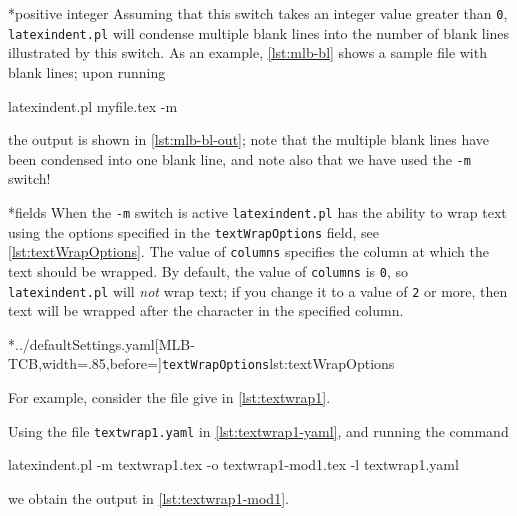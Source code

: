 *{positive integer}
	Assuming that this switch takes an integer value greater than \texttt{0}, \texttt{latexindent.pl} will condense multiple blank lines into the number of blank lines illustrated by this switch.
	As an example, \cref{lst:mlb-bl} shows a sample file with blank lines; upon running \begin{commandshell}
latexindent.pl myfile.tex -m  
\end{commandshell} the output is shown in \cref{lst:mlb-bl-out}; note that the multiple blank lines have been condensed into one blank line, and note also that we have used the \texttt{-m} switch!

	\begin{minipage}{.45\textwidth}
	\end{minipage}%
	\hfill
	\begin{minipage}{.45\textwidth}
	\end{minipage}

*{fields}
	When the \texttt{-m} switch is active \texttt{latexindent.pl} has the ability to wrap text using the options%
	 specified in the \texttt{textWrapOptions} field, see \cref{lst:textWrapOptions}.
	The value of \texttt{columns} specifies the column at which the text should be wrapped.
	By default, the value of \texttt{columns} is \texttt{0}, so \texttt{latexindent.pl} will \emph{not} wrap text; if you change it to a value of \texttt{2} or more, then text will be wrapped after the character in the specified column.

	\cmhlistingsfromfile[style=textWrapOptions]*{../defaultSettings.yaml}[MLB-TCB,width=.85\linewidth,before=\centering]{\texttt{textWrapOptions}}{lst:textWrapOptions}

	For example, consider the file give in \cref{lst:textwrap1}.

	\begin{widepage}
	\end{widepage}

	Using the file \texttt{textwrap1.yaml} in \cref{lst:textwrap1-yaml}, and running the command \begin{commandshell}
latexindent.pl -m textwrap1.tex -o textwrap1-mod1.tex -l textwrap1.yaml
\end{commandshell} we obtain the output in \cref{lst:textwrap1-mod1}.

